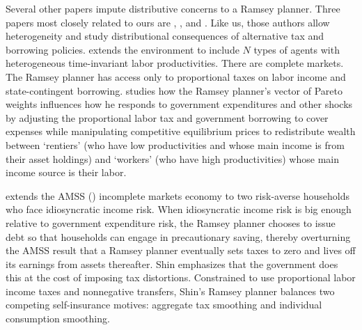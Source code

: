 \documentclass[thmsb,11pt]{article}
\begin{document}
Several other papers impute distributive concerns to a Ramsey planner.
Three papers  most closely related to ours are \citet{Bassetto1999}, \citet{shin2006ramsey}, and \citet{Wer07a}. Like us, those authors allow heterogeneity and study
distributional consequences of alternative tax and borrowing policies.
\citet{Bassetto1999} extends the \citet{LucasJr.1983} environment to include $N$ types of
agents with heterogeneous  time-invariant labor productivities. There are complete markets.  The Ramsey planner  has access only
to proportional taxes on labor income and state-contingent borrowing. \citeauthor{Bassetto1999}  studies how the Ramsey planner's vector of Pareto weights
influences how he responds to government expenditures and other shocks by
adjusting the proportional labor tax and government borrowing to cover
expenses while manipulating competitive equilibrium prices to redistribute wealth between
 `rentiers' (who have low productivities and  whose main income is from their asset holdings)
and  `workers' (who have high productivities) whose main income source is their labor.

\citet{shin2006ramsey} extends the   AMSS (\citet{Aiyagari2002}) incomplete markets economy to  two risk-averse households who
face idiosyncratic income risk. When idiosyncratic income risk is big enough
relative to government expenditure risk, the Ramsey planner
chooses to issue debt so that  households can  engage in precautionary
saving, thereby overturning the AMSS result that  a
 Ramsey planner  eventually sets taxes to zero and lives off its earnings from assets thereafter.
  Shin emphasizes that the
government does this at the cost of imposing tax distortions.
Constrained to use proportional labor income taxes and nonnegative
transfers, Shin's Ramsey planner balances two competing self-insurance
motives: aggregate tax smoothing and individual consumption smoothing.
\end{document}
